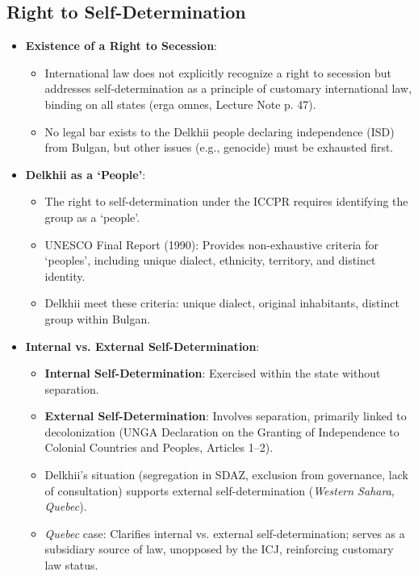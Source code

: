 \subsection{Right to Self-Determination}
\begin{itemize}
    \item \textbf{Existence of a Right to Secession}:
    \begin{itemize}
        \item International law does not explicitly recognize a right to secession but addresses self-determination as a principle of customary international law, binding on all states (erga omnes, Lecture Note p. 47).
        \item No legal bar exists to the Delkhii people declaring independence (ISD) from Bulgan, but other issues (e.g., genocide) must be exhausted first.
    \end{itemize}
    \item \textbf{Delkhii as a ‘People’}:
    \begin{itemize}
        \item The right to self-determination under the ICCPR requires identifying the group as a ‘people’.
        \item UNESCO Final Report (1990): Provides non-exhaustive criteria for ‘peoples’, including unique dialect, ethnicity, territory, and distinct identity.
        \item Delkhii meet these criteria: unique dialect, original inhabitants, distinct group within Bulgan.
    \end{itemize}
    \item \textbf{Internal vs. External Self-Determination}:
    \begin{itemize}
        \item \textbf{Internal Self-Determination}: Exercised within the state without separation.
        \item \textbf{External Self-Determination}: Involves separation, primarily linked to decolonization (UNGA Declaration on the Granting of Independence to Colonial Countries and Peoples, Articles 1–2).
        \item Delkhii’s situation (segregation in SDAZ, exclusion from governance, lack of consultation) supports external self-determination (\textit{Western Sahara}, \textit{Quebec}).
        \item \textit{Quebec} case: Clarifies internal vs. external self-determination; serves as a subsidiary source of law, unopposed by the ICJ, reinforcing customary law status.

\end{itemize}
\end{itemize}
